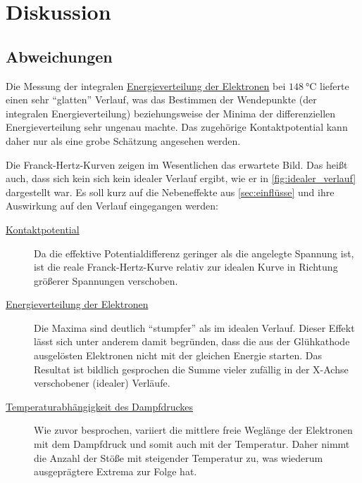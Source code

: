 \section{Diskussion}
\label{sec:diskussion}

\subsection{Abweichungen}

Die Messung der integralen \hyperref[sec:auswertung:energieverteilung]{Energieverteilung der Elektronen}
bei $\SI{148}{\celsius}$
lieferte einen sehr \enquote{glatten} Verlauf,
was das Bestimmen der Wendepunkte (der integralen Energieverteilung)
beziehungsweise der Minima der differenziellen Energieverteilung sehr ungenau machte.
Das zugehörige Kontaktpotential kann daher nur als eine grobe Schätzung angesehen werden.


Die Franck-Hertz-Kurven zeigen im Wesentlichen das erwartete Bild.
Das heißt auch, dass sich kein sich kein idealer Verlauf ergibt,
wie er in \autoref{fig:idealer_verlauf} dargestellt war.
Es soll kurz auf die Nebeneffekte aus \autoref{sec:einflüsse}
und ihre Auswirkung auf den Verlauf eingegangen werden:

\begin{description}
  \item[{\hyperref[sec:einflüsse:kontaktpotential]{Kontaktpotential}}]
  Da die effektive Potentialdifferenz geringer als die angelegte Spannung ist,
  ist die reale Franck-Hertz-Kurve relativ zur idealen Kurve
  in Richtung größerer Spannungen verschoben.

  \item[{\hyperref[sec:einflüsse:energieverteilung]{Energieverteilung der Elektronen}}]
  Die Maxima sind deutlich \enquote{stumpfer} als im idealen Verlauf.
  Dieser Effekt lässt sich unter anderem damit begründen,
  dass die aus der Glühkathode ausgelösten Elektronen nicht mit der gleichen Energie starten.
  Das Resultat ist bildlich gesprochen die Summe vieler zufällig in der X-Achse verschobener (idealer) Verläufe.

  \item[{\hyperref[sec:einflüsse:dampfdruck]{Temperaturabhängigkeit des Dampfdruckes}}]
  Wie zuvor besprochen,
  variiert die mittlere freie Weglänge der Elektronen
  mit dem Dampfdruck und somit auch mit der Temperatur.
  Daher nimmt die Anzahl der Stöße mit steigender Temperatur zu,
  was wiederum ausgeprägtere Extrema zur Folge hat.
\end{description}


